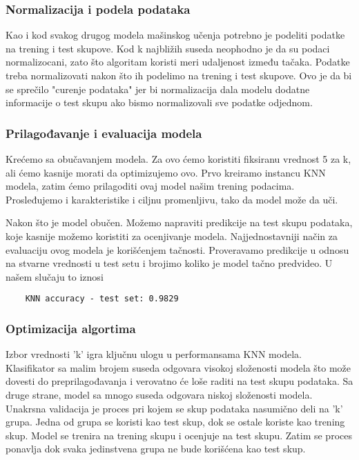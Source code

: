 \documentclass[a4paper,12pt]{article}
\begin{document}
\subsubsection{Normalizacija i podela podataka}
Kao i kod svakog drugog modela mašinskog učenja potrebno je podeliti podatke na trening i test skupove. Kod k najbližih suseda neophodno je da su podaci normalizocani, zato što algoritam koristi meri udaljenost između tačaka.
Podatke treba normalizovati nakon što ih podelimo na trening i test skupove. Ovo je da bi se sprečilo "curenje podataka" jer bi normalizacija dala modelu dodatne informacije o test skupu ako bismo normalizovali sve podatke odjednom.

\subsubsection{Prilagođavanje i evaluacija modela}
Krećemo sa obučavanjem modela. Za ovo ćemo koristiti fiksiranu vrednost 5 za k, ali ćemo kasnije morati da optimizujemo ovo. Prvo kreiramo instancu KNN modela, zatim ćemo prilagoditi ovaj model našim trening podacima. Prosleđujemo i karakteristike i ciljnu promenljivu, tako da model može da uči.

Nakon što je model obučen. Možemo napraviti predikcije na test skupu podataka, koje kasnije možemo koristiti za ocenjivanje modela.
Najjednostavniji način za evaluaciju ovog modela je korišćenjem tačnosti. Proveravamo predikcije u odnosu na stvarne vrednosti u test setu i brojimo koliko je model tačno predvideo.
U našem slučaju to iznosi

\begin{verbatim}
    KNN accuracy - test set: 0.9829
\end{verbatim}

\subsubsection{Optimizacija algortima}
Izbor vrednosti 'k' igra ključnu ulogu u performansama KNN modela. Klasifikator sa malim brojem suseda odgovara visokoj složenosti modela što može dovesti do preprilagođavanja i verovatno će loše raditi na test skupu podataka. Sa druge strane, model sa mnogo suseda odgovara niskoj složenosti modela.
Unakrsna validacija je proces pri kojem se skup podataka nasumično deli na 'k' grupa. Jedna od grupa se koristi kao test skup, dok se ostale koriste kao trening skup. Model se trenira na trening skupu i ocenjuje na test skupu. Zatim se proces ponavlja dok svaka jedinstvena grupa ne bude korišćena kao test skup.
\end{document}
